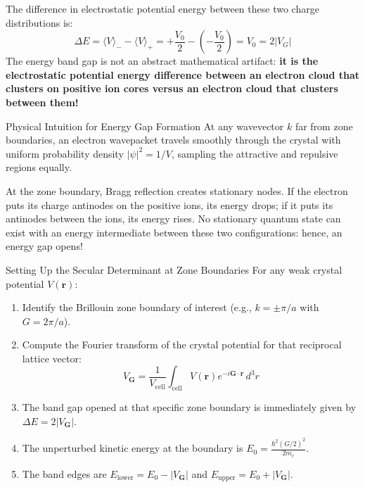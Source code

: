 \documentclass[11pt,a4paper]{article}
\newcommand{\vb}[1]{\mathbf{#1}}
\begin{document}
The difference in electrostatic potential energy between these two charge distributions is:
\begin{equation}
\Delta E = \langle V \rangle_- - \langle V \rangle_+ = +\frac{V_0}{2} - \left(-\frac{V_0}{2}\right) = V_0 = 2|V_G|
\end{equation}
The energy band gap is not an abstract mathematical artifact: \textbf{it is the electrostatic potential energy difference between an electron cloud that clusters on positive ion cores versus an electron cloud that clusters between them!}

\begin{checkpointbox}{Physical Intuition for Energy Gap Formation}
At any wavevector $k$ far from zone boundaries, an electron wavepacket travels smoothly through the crystal with uniform probability density $|\psi|^2 = 1/V$, sampling the attractive and repulsive regions equally. 

At the zone boundary, Bragg reflection creates stationary nodes. If the electron puts its charge antinodes on the positive ions, its energy drops; if it puts its antinodes between the ions, its energy rises. No stationary quantum state can exist with an energy intermediate between these two configurations: hence, an energy gap opens!
\end{checkpointbox}

\begin{methodbox}{Setting Up the Secular Determinant at Zone Boundaries}
For any weak crystal potential $V(\vb{r})$:
\begin{enumerate}
    \item Identify the Brillouin zone boundary of interest (e.g., $k = \pm \pi/a$ with $G = 2\pi/a$).
    \item Compute the Fourier transform of the crystal potential for that reciprocal lattice vector:
    \[
    V_{\vb{G}} = \frac{1}{V_{\mathrm{cell}}}\int_{\mathrm{cell}} V(\vb{r}) e^{-i\vb{G}\cdot\vb{r}}\,d^3r
    \]
    \item The band gap opened at that specific zone boundary is immediately given by $\Delta E = 2|V_{\vb{G}}|$.
    \item The unperturbed kinetic energy at the boundary is $E_0 = \frac{\hbar^2 (G/2)^2}{2m_e}$.
    \item The band edges are $E_{\mathrm{lower}} = E_0 - |V_{\vb{G}}|$ and $E_{\mathrm{upper}} = E_0 + |V_{\vb{G}}|$.
\end{enumerate}
\end{methodbox}
\end{document}
